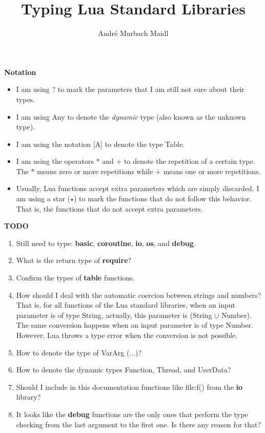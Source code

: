 \documentclass[12pt]{article}
\title{Typing Lua Standard Libraries}
\author{André Murbach Maidl}
\begin{document}
\maketitle

\textbf{Notation}

\begin{itemize}
\item I am using ? to mark the parameters that I am still not
sure about their types.
\item I am using Any to denote the \textit{dynamic} type
(also known as the unknown type).
\item I am using the notation [A] to denote the type Table.
\item I am using the operators * and + to denote the repetition
of a certain type. The * means zero or more repetitions while +
means one or more repetitions.
\item Usually, Lua functions accept extra parameters which are
simply discarded.
I am using a star ($\star$) to mark the functions that do not
follow this behavior.
That is, the functions that do not accept extra parameters.
\end{itemize}

\newpage

\textbf{TODO}

\begin{enumerate}
\item Still need to type: \textbf{basic}, \textbf{coroutine},
\textbf{io}, \textbf{os}, and \textbf{debug}.
\item What is the return type of \textbf{require}?
\item Confirm the types of \textbf{table} functions.
\item How should I deal with the automatic coercion between
strings and numbers?
That is, for all functions of the Lua standard libraries,
when an input parameter is of type String, actually, this
parameter is (String $\cup$ Number).
The same conversion happens when an input parameter is of type
Number.
However, Lua throws a type error when the conversion is not
possible.
\item How to denote the type of VarArg (...)?
\item How to denote the dynamic types Function, Thread, and UserData?
\item Should I include in this documentation functions like
file:f() from the \textbf{io} library?
\item It looks like the \textbf{debug} functions are the only ones
that perform the type checking from the last argument to the first
one.
Is there any reason for that?
\end{enumerate}
\end{document}
